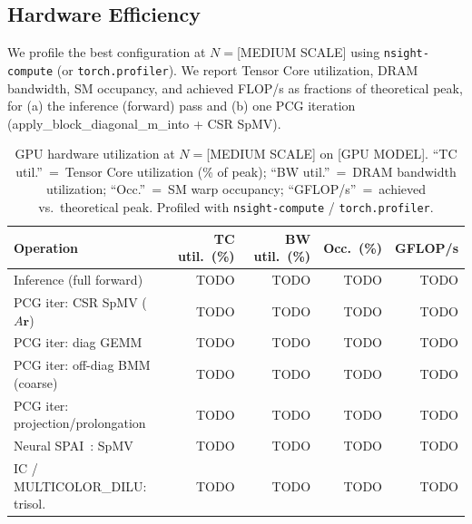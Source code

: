 \documentclass[acmtog,anonymous,review]{acmart}
\begin{document}

\subsection{Hardware Efficiency}
\label{sec:results:hw}

We profile the best configuration at $N = $[MEDIUM SCALE] using \texttt{nsight-compute}
(or \texttt{torch.profiler}).  We report Tensor Core utilization, DRAM bandwidth, SM occupancy,
and achieved FLOP/s as fractions of theoretical peak, for (a) the inference (forward) pass and
(b) one PCG iteration (apply\_block\_diagonal\_m\_into + CSR SpMV).

\begin{table}[h]
\centering
\caption{GPU hardware utilization at $N = $[MEDIUM SCALE] on [GPU MODEL].
``TC util.''~=~Tensor Core utilization (\% of peak); ``BW util.''~=~DRAM bandwidth utilization;
``Occ.''~=~SM warp occupancy; ``GFLOP/s''~=~achieved vs.\ theoretical peak.
Profiled with \texttt{nsight-compute} / \texttt{torch.profiler}.
}
\label{tab:hw:util}
\begin{tabular}{lrrrr}
\hline
Operation & TC util.\ (\%) & BW util.\ (\%) & Occ.\ (\%) & GFLOP/s \\
\hline
Inference (full forward)         & TODO & TODO & TODO & TODO \\
PCG iter: CSR SpMV ($A\mathbf{r}$)     & TODO & TODO & TODO & TODO \\
PCG iter: diag GEMM              & TODO & TODO & TODO & TODO \\
PCG iter: off-diag BMM (coarse)  & TODO & TODO & TODO & TODO \\
PCG iter: projection/prolongation & TODO & TODO & TODO & TODO \\
\hline
Neural SPAI~\cite{yang2025sparse}: SpMV & TODO & TODO & TODO & TODO \\
IC / MULTICOLOR\_DILU: trisol.   & TODO & TODO & TODO & TODO \\
\hline
\end{tabular}
\end{table}
\end{document}
